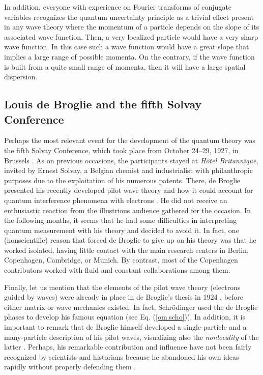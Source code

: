 \documentclass[onecolumn,nofootinbib, secnumarabic, amsmath, nobibnotes,12pt,aps,pra]{revtex4-1}
\newcommand{\eref}[1]{Eq. (\ref{#1})}
\begin{document}
In addition, everyone with experience on Fourier transforms of
conjugate variables recognizes the quantum uncertainty principle as
a trivial effect present in any wave theory where the momentum of a
particle depends on the slope of its associated wave function. Then,
a very localized particle would have a very sharp wave function.
In this case such a wave function would have a great slope that implies
a large range of possible momenta. On the contrary, if the wave
function is built from a quite small range of momenta, then it will
have a large spatial dispersion.


\subsection{Louis de Broglie and the fifth Solvay Conference}\label{om.sec_intro.5}

Perhaps the most relevant event for the development of the quantum
theory was the fifth Solvay Conference, which took place from
October 24--29, 1927, in Brussels \cite{om.valentini2009Solvay}. As
on previous occasions, the participants stayed at \textit{H\^{o}tel
Britannique}, invited by Ernest Solvay, a Belgian chemist and
industrialist with philanthropic purposes due to the exploitation of
his numerous patents. There, de Broglie presented his recently
developed pilot wave theory and how it could account for quantum
interference phenomena with electrons \cite{om.valentini2009Solvay}.
He did not receive an enthusiastic reaction from the illustrious
audience gathered for the occasion. In the following months, it
seems that he had some difficulties in interpreting quantum
measurement with his theory and decided to avoid it. In fact, one
(nonscientific) reason that forced de Broglie to give up on his
theory was that he worked isolated, having little contact with the
main research centers in Berlin, Copenhagen, Cambridge, or Munich.
By contrast, most of the Copenhagen contributors worked with fluid
and constant collaborations among them.

Finally, let us mention that the elements of the pilot wave theory
(electrons guided by waves) were already in place in de Broglie's
thesis in 1924 \cite{om.debroglie1923}, before either matrix or wave
mechanics existed. In fact, Schr\"odinger used the de Broglie phases
to develop his famous equation (see \eref{om.scho}). In addition, it
is important to remark that de Broglie himself developed a
single-particle and a many-particle description of his pilot waves,
visualizing also the \textit{nonlocality} of the latter
\cite{om.valentini2009Solvay}. Perhaps, his remarkable contribution
and influence have not been fairly recognized by scientists and
historians because he abandoned his own ideas rapidly without properly
defending them \cite{om.valentini2009Solvay,om.Broglie1956}.
\end{document}
